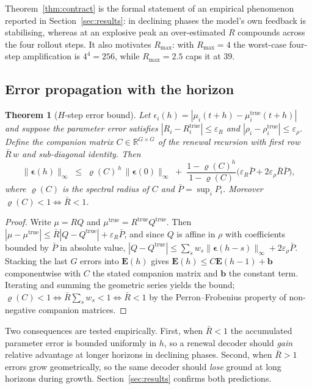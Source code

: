 \documentclass[conference]{IEEEtran}
\newtheorem{theorem}{Theorem}
\newcommand{\bR}{\mathbb{R}}
\begin{document}
Theorem~\ref{thm:contract} is the formal statement of an empirical phenomenon reported in Section~\ref{sec:results}: in declining phases the model's own feedback is stabilising, whereas at an explosive peak an over-estimated $R$ compounds across the four rollout steps. It also motivates $R_{\max}$: with $R_{\max}=4$ the worst-case four-step amplification is $4^4=256$, while $R_{\max}=2.5$ caps it at $39$.

\subsection{Error propagation with the horizon}

\begin{theorem}[$H$-step error bound]\label{thm:error}
Let $\epsilon_i(h)=|\mu_i(t+h)-\mu^{\mathrm{true}}_i(t+h)|$ and suppose the parameter error satisfies $|R_i-R_i^{\mathrm{true}}|\le\varepsilon_R$ and $|\rho_i-\rho^{\mathrm{true}}_i|\le\varepsilon_\rho$. Define the companion matrix $C\in\bR^{G\times G}$ of the renewal recursion with first row $\bar R\,w$ and sub-diagonal identity. Then
\begin{equation}
\|\boldsymbol{\epsilon}(h)\|_\infty \;\le\; \varrho(C)^{\,h}\,\|\boldsymbol{\epsilon}(0)\|_\infty \;+\; \frac{1-\varrho(C)^{h}}{1-\varrho(C)}\Big(\varepsilon_R\bar P + 2\varepsilon_\rho \bar R \bar P\Big),
\end{equation}
where $\varrho(C)$ is the spectral radius of $C$ and $\bar P=\sup_i P_i$. Moreover $\varrho(C)<1 \iff \bar R<1$.
\end{theorem}
\begin{proof}
Write $\mu=RQ$ and $\mu^{\mathrm{true}}=R^{\mathrm{true}}Q^{\mathrm{true}}$. Then $|\mu-\mu^{\mathrm{true}}|\le \bar R|Q-Q^{\mathrm{true}}| + \varepsilon_R \bar P$, and since $Q$ is affine in $\rho$ with coefficients bounded by $\bar P$ in absolute value, $|Q-Q^{\mathrm{true}}|\le \sum_s w_s\|\boldsymbol\epsilon(h-s)\|_\infty + 2\varepsilon_\rho\bar P$. Stacking the last $G$ errors into $\mathbf{E}(h)$ gives $\mathbf E(h)\le C\mathbf E(h-1) + \mathbf b$ componentwise with $C$ the stated companion matrix and $\mathbf b$ the constant term. Iterating and summing the geometric series yields the bound; $\varrho(C)<1\iff\bar R\sum_s w_s<1\iff\bar R<1$ by the Perron--Frobenius property of non-negative companion matrices. \end{proof}

Two consequences are tested empirically. First, when $\bar R<1$ the accumulated parameter error is bounded uniformly in $h$, so a renewal decoder should \emph{gain} relative advantage at longer horizons in declining phases. Second, when $\bar R>1$ errors grow geometrically, so the same decoder should \emph{lose} ground at long horizons during growth. Section~\ref{sec:results} confirms both predictions.
\end{document}
